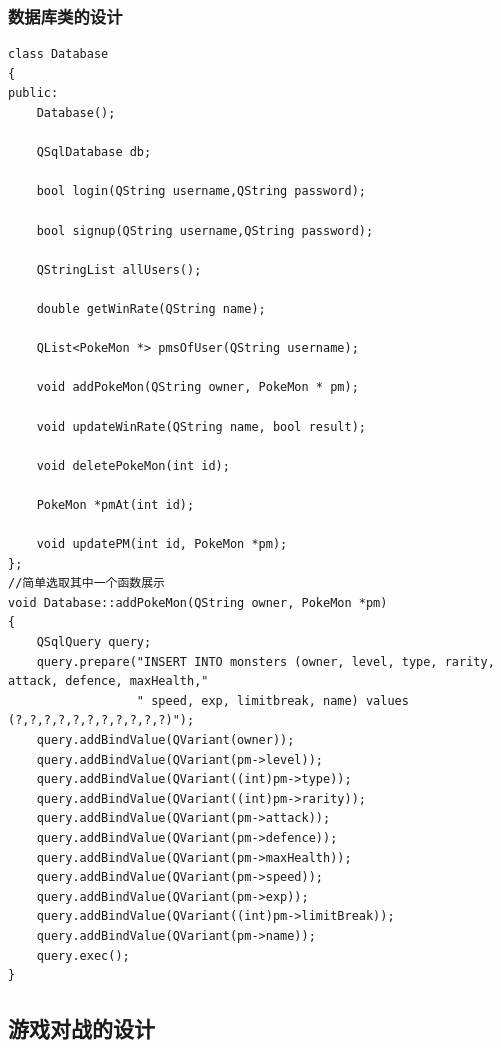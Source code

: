 \documentclass{article}
\begin{document}
  \subsubsection{数据库类的设计}
    \begin{verbatim}
class Database
{
public:
    Database();

    QSqlDatabase db;

    bool login(QString username,QString password);

    bool signup(QString username,QString password);

    QStringList allUsers();

    double getWinRate(QString name);

    QList<PokeMon *> pmsOfUser(QString username);

    void addPokeMon(QString owner, PokeMon * pm);

    void updateWinRate(QString name, bool result);

    void deletePokeMon(int id);

    PokeMon *pmAt(int id);

    void updatePM(int id, PokeMon *pm);
};
//简单选取其中一个函数展示
void Database::addPokeMon(QString owner, PokeMon *pm)
{
    QSqlQuery query;
    query.prepare("INSERT INTO monsters (owner, level, type, rarity, attack, defence, maxHealth,"
                  " speed, exp, limitbreak, name) values (?,?,?,?,?,?,?,?,?,?,?)");
    query.addBindValue(QVariant(owner));
    query.addBindValue(QVariant(pm->level));
    query.addBindValue(QVariant((int)pm->type));
    query.addBindValue(QVariant((int)pm->rarity));
    query.addBindValue(QVariant(pm->attack));
    query.addBindValue(QVariant(pm->defence));
    query.addBindValue(QVariant(pm->maxHealth));
    query.addBindValue(QVariant(pm->speed));
    query.addBindValue(QVariant(pm->exp));
    query.addBindValue(QVariant((int)pm->limitBreak));
    query.addBindValue(QVariant(pm->name));
    query.exec();
}

\end{verbatim}
  
\subsection{游戏对战的设计}
\end{document}
